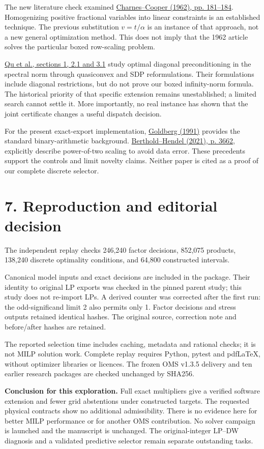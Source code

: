 \documentclass[10pt,a4paper]{article}
\begin{document}
The new literature check examined
\href{https://iiif.library.cmu.edu/file/Cooper_box00010_fld00009_bdl0001_doc0001/Cooper_box00010_fld00009_bdl0001_doc0001.pdf}{Charnes--Cooper (1962), pp. 181--184}.
Homogenizing positive fractional variables into linear constraints is an
established technique. The previous substitution $v=t/\alpha$ is an instance
of that approach, not a new general optimization method. This does not imply
that the 1962 article solves the particular boxed row-scaling problem.

\href{https://arxiv.org/html/2209.00809v2}{Qu et al., sections 1, 2.1 and 3.1}
study optimal diagonal preconditioning in the spectral norm through
quasiconvex and SDP reformulations. Their formulations include diagonal
restrictions, but do not prove our boxed infinity-norm formula. The historical
priority of that specific extension remains unestablished; a limited search
cannot settle it. More importantly, no real instance has shown that the joint
certificate changes a useful dispatch decision.

For the present exact-export implementation,
\href{https://docs.oracle.com/cd/E19957-01/806-3568/ncg_goldberg.html}{Goldberg (1991)}
provides the standard binary-arithmetic background.
\href{https://ojs.aaai.org/index.php/AAAI/article/view/16482/16289}{Berthold--Hendel
(2021), p. 3662}, explicitly describe power-of-two scaling to avoid data error.
These precedents support the controls and limit novelty claims. Neither paper
is cited as a proof of our complete discrete selector.

\section*{7. Reproduction and editorial decision}
The independent replay checks 246,240 factor decisions, 852,075 products, 138,240 discrete optimality conditions, and 64,800 constructed intervals.

Canonical model inputs and exact decisions are included in the package. Their
identity to original LP exports was checked in the pinned parent study; this
study does not re-import LPs. A derived counter was corrected after the first
run: the odd-significand limit 2 also permits only 1. Factor decisions and
stress outputs retained identical hashes. The original source, correction
note and before/after hashes are retained.

The reported selection time includes caching, metadata and rational checks;
it is not MILP solution work. Complete replay requires Python, pytest and
pdfLaTeX, without optimizer libraries or licences. The frozen OMS v1.3.5
delivery and ten earlier research packages are checked unchanged by SHA256.

\textbf{Conclusion for this exploration.} Full exact multipliers give a
verified software extension and fewer grid abstentions under constructed
targets. The requested physical contracts show no additional admissibility.
There is no evidence here for better MILP performance or for another OMS
contribution. No solver campaign is launched and the manuscript is unchanged.
The original-integer LP--DW diagnosis and a validated predictive selector
remain separate outstanding tasks.
\end{document}
